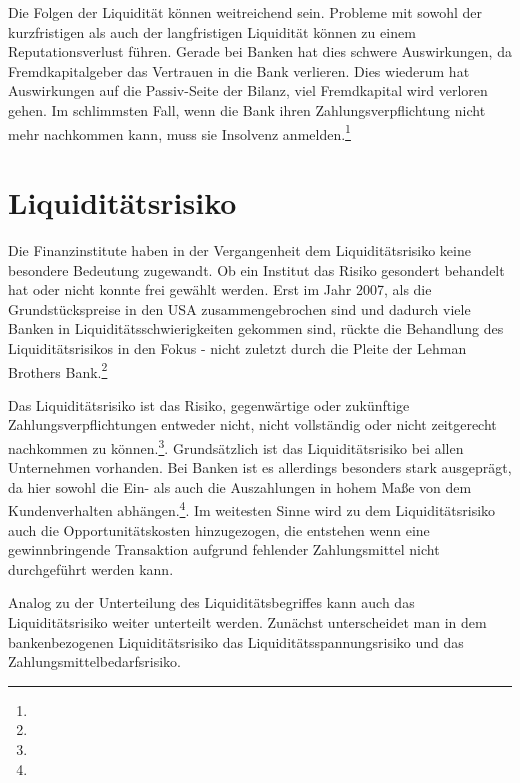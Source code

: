 Die Folgen der Liquidität können weitreichend sein. Probleme mit sowohl der kurzfristigen als auch der langfristigen Liquidität können zu einem Reputationsverlust führen. Gerade bei Banken hat dies schwere Auswirkungen, da Fremdkapitalgeber das Vertrauen in die Bank verlieren. Dies wiederum hat Auswirkungen auf die Passiv-Seite der Bilanz, viel Fremdkapital wird verloren gehen. Im schlimmsten Fall, wenn die Bank ihren Zahlungsverpflichtung nicht mehr nachkommen kann, muss sie Insolvenz anmelden.\footnote{ }

\section{Liquiditätsrisiko}
Die Finanzinstitute haben in der Vergangenheit dem Liquiditätsrisiko keine besondere Bedeutung zugewandt. Ob ein Institut das Risiko gesondert behandelt hat oder nicht konnte frei gewählt werden. Erst im Jahr 2007, als die Grundstückspreise in den USA zusammengebrochen sind und dadurch viele Banken in Liquiditätsschwierigkeiten gekommen sind, rückte die Behandlung des Liquiditätsrisikos in den Fokus - nicht zuletzt durch die Pleite der Lehman Brothers Bank.\footnote{ }


Das Liquiditätsrisiko ist das Risiko, gegenwärtige oder zukünftige Zahlungsverpflichtungen entweder nicht, nicht vollständig oder nicht zeitgerecht nachkommen zu können.\footnote{  }. Grundsätzlich ist das Liquiditätsrisiko bei allen Unternehmen vorhanden. Bei Banken ist es allerdings besonders stark ausgeprägt, da hier sowohl die Ein- als auch die Auszahlungen in hohem Maße von dem Kundenverhalten abhängen.\footnote{ }. Im weitesten Sinne wird zu dem Liquiditätsrisiko auch die Opportunitätskosten hinzugezogen, die entstehen wenn eine gewinnbringende Transaktion aufgrund fehlender Zahlungsmittel nicht durchgeführt werden kann.

Analog zu der Unterteilung des Liquiditätsbegriffes kann auch das Liquiditätsrisiko weiter unterteilt werden. Zunächst unterscheidet man in dem bankenbezogenen Liquiditätsrisiko das Liquiditätsspannungsrisiko und das Zahlungsmittelbedarfsrisiko.

